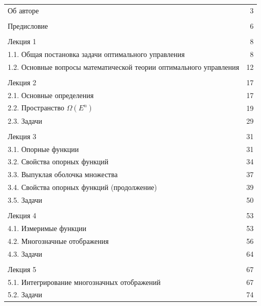 \documentclass[8pt]{extarticle}
\begin{document}
\begin{tabularx}{\textwidth}{@{}Xr@{}}
Об авторе & 3 \\
& \\
Предисловие & 6 \\
& \\
Лекция 1 & 8 \\
\hspace*{1em}1.1. Общая постановка задачи оптимального управления & 8 \\
\hspace*{1em}1.2. Основные вопросы математической теории оптимального управления & 12 \\
& \\
Лекция 2 & 17 \\
\hspace*{1em}2.1. Основные определения & 17 \\
\hspace*{1em}2.2. Пространство \(\Omega\left( E^n \right)\) & 19 \\
\hspace*{1em}2.3. Задачи & 29 \\
& \\
Лекция 3 & 31 \\
\hspace*{1em}3.1. Опорные функции & 31 \\
\hspace*{1em}3.2. Свойства опорных функций & 34 \\
\hspace*{1em}3.3. Выпуклая оболочка множества & 37 \\
\hspace*{1em}3.4. Свойства опорных функций (продолжение) & 39 \\
\hspace*{1em}3.5. Задачи & 50 \\
& \\
Лекция 4 & 53 \\
\hspace*{1em}4.1. Измеримые функции & 53 \\
\hspace*{1em}4.2. Многозначные отображения & 56 \\
\hspace*{1em}4.3. Задачи & 64 \\
& \\
Лекция 5 & 67 \\
\hspace*{1em}5.1. Интегрирование многозначных отображений & 67 \\
\hspace*{1em}5.2. Задачи & 74 \\
\end{tabularx}
\end{document}
